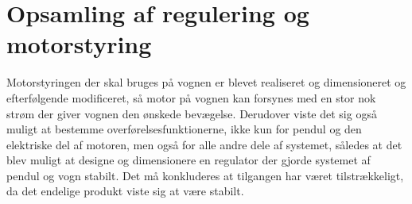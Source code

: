 \section{Opsamling af regulering og motorstyring}
Motorstyringen der skal bruges på vognen er blevet realiseret og dimensioneret og efterfølgende modificeret, så motor på vognen kan forsynes med en stor nok strøm der giver vognen den ønskede bevægelse.
Derudover viste det sig også muligt at bestemme overførelsesfunktionerne, ikke kun for pendul og den elektriske del af motoren, men også for alle andre dele af systemet, således at det blev muligt at designe og dimensionere en regulator der gjorde systemet af pendul og vogn stabilt.
Det må konkluderes at tilgangen har været tilstrækkeligt, da det endelige produkt viste sig at være stabilt.











